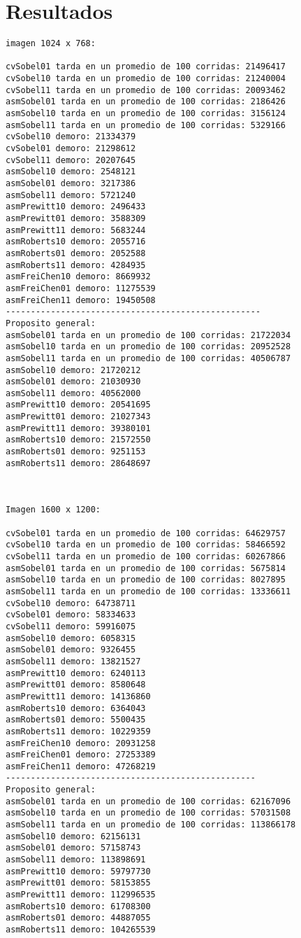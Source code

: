 \documentclass[11pt]{article}
\begin{document}
\section{Resultados}
\begin{lstlisting}[frame=single]
imagen 1024 x 768:

cvSobel01 tarda en un promedio de 100 corridas: 21496417
cvSobel10 tarda en un promedio de 100 corridas: 21240004
cvSobel11 tarda en un promedio de 100 corridas: 20093462
asmSobel01 tarda en un promedio de 100 corridas: 2186426
asmSobel10 tarda en un promedio de 100 corridas: 3156124
asmSobel11 tarda en un promedio de 100 corridas: 5329166
cvSobel10 demoro: 21334379
cvSobel01 demoro: 21298612
cvSobel11 demoro: 20207645
asmSobel10 demoro: 2548121
asmSobel01 demoro: 3217386
asmSobel11 demoro: 5721240
asmPrewitt10 demoro: 2496433
asmPrewitt01 demoro: 3588309
asmPrewitt11 demoro: 5683244
asmRoberts10 demoro: 2055716
asmRoberts01 demoro: 2052588
asmRoberts11 demoro: 4284935
asmFreiChen10 demoro: 8669932
asmFreiChen01 demoro: 11275539
asmFreiChen11 demoro: 19450508
---------------------------------------------------
Proposito general:
asmSobel01 tarda en un promedio de 100 corridas: 21722034
asmSobel10 tarda en un promedio de 100 corridas: 20952528
asmSobel11 tarda en un promedio de 100 corridas: 40506787
asmSobel10 demoro: 21720212
asmSobel01 demoro: 21030930
asmSobel11 demoro: 40562000
asmPrewitt10 demoro: 20541695
asmPrewitt01 demoro: 21027343
asmPrewitt11 demoro: 39380101
asmRoberts10 demoro: 21572550
asmRoberts01 demoro: 9251153
asmRoberts11 demoro: 28648697



Imagen 1600 x 1200:

cvSobel01 tarda en un promedio de 100 corridas: 64629757
cvSobel10 tarda en un promedio de 100 corridas: 58466592
cvSobel11 tarda en un promedio de 100 corridas: 60267866
asmSobel01 tarda en un promedio de 100 corridas: 5675814
asmSobel10 tarda en un promedio de 100 corridas: 8027895
asmSobel11 tarda en un promedio de 100 corridas: 13336611
cvSobel10 demoro: 64738711
cvSobel01 demoro: 58334633
cvSobel11 demoro: 59916075
asmSobel10 demoro: 6058315
asmSobel01 demoro: 9326455
asmSobel11 demoro: 13821527
asmPrewitt10 demoro: 6240113
asmPrewitt01 demoro: 8580648
asmPrewitt11 demoro: 14136860
asmRoberts10 demoro: 6364043
asmRoberts01 demoro: 5500435
asmRoberts11 demoro: 10229359
asmFreiChen10 demoro: 20931258
asmFreiChen01 demoro: 27253389
asmFreiChen11 demoro: 47268219
--------------------------------------------------
Proposito general:
asmSobel01 tarda en un promedio de 100 corridas: 62167096
asmSobel10 tarda en un promedio de 100 corridas: 57031508
asmSobel11 tarda en un promedio de 100 corridas: 113866178
asmSobel10 demoro: 62156131
asmSobel01 demoro: 57158743
asmSobel11 demoro: 113898691
asmPrewitt10 demoro: 59797730
asmPrewitt01 demoro: 58153855
asmPrewitt11 demoro: 112996535
asmRoberts10 demoro: 61708300
asmRoberts01 demoro: 44887055
asmRoberts11 demoro: 104265539




\end{lstlisting}
\end{document}
